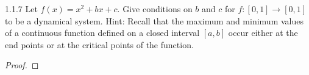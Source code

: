\begin{problem}{1.1.7}
  Let $f(x) = x^2 + bx + c$. Give conditions on $b$ and $c$ for $f: [0, 1] \to [0, 1]$
  to be a dynamical system. Hint: Recall that the maximum and minimum values of
  a continuous function defined on a closed interval $[a, b]$ occur either at
  the end points or at the critical points of the function.
\end{problem}

\begin{proof}
\end{proof}
\newpage
